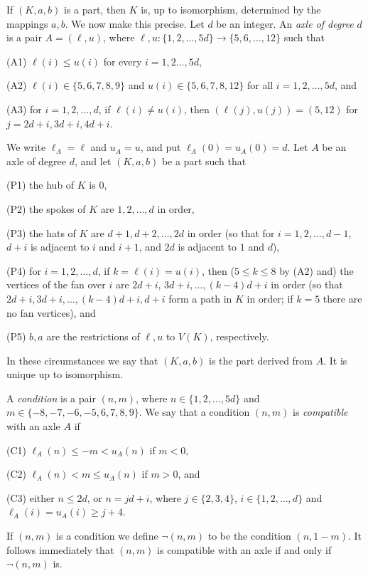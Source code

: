 If $(K,a,b)$ is a part, then $K$ is, up to isomorphism, determined by 
the mappings $a,b$.  
We now make this precise.  Let $d$ be an integer.  An {\it axle of degree} 
$d$ is a pair
$A=(\ell, u)$, where $\ell, u:\{1,2,\dots, 5d\}\to\{5,6,\dots, 12\}$ such 
that
\item{(A1)} $\ell (i)\le u(i)$  for every $i=1,2\dots, 5d$, 
\item{(A2)} $\ell (i)\in\{5,6,7,8,9\}$ and $u(i)\in\{5,6,7,8,12\}$ 
for all $i=1,2,\dots, 5d$, and 

\item{(A3)} for $i=1,2,\dots, d$, if $\ell (i)\ne u(i)$, then $(\ell
(j),  u(j))=(5,12)$ for
$j=2d+i, 3d+i, 4d+i$.

\noindent We write $\ell_A=\ell$ and $u_A=u$, and put $\ell
_A(0)=u_A(0)=d$. Let $A$ be an axle of degree $d$, and let $(K,a,b)$ be
a part such that  
\item{(P1)} the hub of $K$ is 0,
\item{(P2)} the spokes of $K$ are $1,2,\dots, d$ in order,
\item{(P3)} the hats of $K$ are $d+1,d+2,\dots, 2d$ in order
(so that for $i=1,2,\dots, d-1$, $d+i$ is adjacent to $i$ and $i+1$,
and $2d$ is adjacent to $1$ and $d$), 
\item{(P4)} for $i=1,2,\dots, d$, if $k=\ell (i)=u(i)$, then 
($5\le k\le 8$ by (A2) and) the vertices of the fan over  $i$ are
$2d+i$, $3d+i,\dots, (k-4)d+i$ in order (so that $2d+i,3d+i,\dots,
(k-4)d+i,d+i$ form a path in $K$ in order; if $k=5$ there are no fan vertices),
and 
\item{(P5)} $b,a$ are the restrictions of $\ell, u$ to $V(K)$,
respectively.

\noindent In these circumstances we say that $(K,a,b)$ is the part derived 
from $A$.
It is unique up to isomorphism.

A {\it condition} is a pair $(n,m)$, where $n\in \{1,2,\dots, 5d\}$ and 
$m\in\{-8, -7, -6, -5, 6, 7, \allowbreak8, 9\}$.  We say that a
condition $(n,m)$  is 
{\it compatible} with an axle $A$ if 
\item{(C1)} $\ell_A(n)\le-m<u_A(n)$ if $m<0$,
\item{(C2)} $\ell_A(n)<m\le u_A(n)$ if $m>0$, and
\item{(C3)} either $n\le 2d$, or $n=jd+i$, where $j\in \{2,3,4\}$,
$i\in  \{1,2,\dots, d\}$
and $\ell_A(i)=u_A(i)\ge j+4$.
\smallskip

\noindent If $(n,m)$ is a condition we define $\neg(n,m)$ to be the
condition  $(n,1-m)$.
It follows immediately that $(n,m)$ is compatible with an axle if and 
only if $\neg(n,m)$ is.

